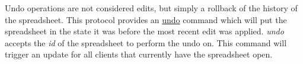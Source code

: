 Undo operations are not considered edits, but simply a rollback of the history 
of the spreadsheet. This protocol provides an \hyperref[sec:message:undo]{undo} 
command which will put the spreadsheet in the state it was before the most 
recent edit was applied. \emph{undo} accepts the \emph{id} of the spreadsheet 
to perform the undo on. This command will trigger an update for all clients 
that currently have the spreadsheet open.

